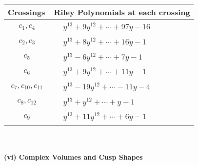 \documentclass[1p]{elsarticle_modified}
\theoremstyle{definition}
\begin{document}
\begin{tabular}{m{50pt}|m{274pt}}
Crossings & \hspace{64pt}Riley Polynomials at each crossing \\
\hline $$\begin{aligned}c_{1},c_{4}\end{aligned}$$&$\begin{aligned}
&y^{13}+9 y^{12}+\cdots+97 y-16
\end{aligned}$\\
\hline $$\begin{aligned}c_{2},c_{3}\end{aligned}$$&$\begin{aligned}
&y^{13}+8 y^{12}+\cdots+16 y-1
\end{aligned}$\\
\hline $$\begin{aligned}c_{5}\end{aligned}$$&$\begin{aligned}
&y^{13}-6 y^{12}+\cdots+7 y-1
\end{aligned}$\\
\hline $$\begin{aligned}c_{6}\end{aligned}$$&$\begin{aligned}
&y^{13}+9 y^{12}+\cdots+11 y-1
\end{aligned}$\\
\hline $$\begin{aligned}c_{7},c_{10},c_{11}\end{aligned}$$&$\begin{aligned}
&y^{13}-19 y^{12}+\cdots-11 y-4
\end{aligned}$\\
\hline $$\begin{aligned}c_{8},c_{12}\end{aligned}$$&$\begin{aligned}
&y^{13}+y^{12}+\cdots+y-1
\end{aligned}$\\
\hline $$\begin{aligned}c_{9}\end{aligned}$$&$\begin{aligned}
&y^{13}+11 y^{12}+\cdots+6 y-1
\end{aligned}$\\
\hline
\end{tabular}\\~\\
\newpage\flushleft \textbf{(vi) Complex Volumes and Cusp Shapes}
\end{document}
